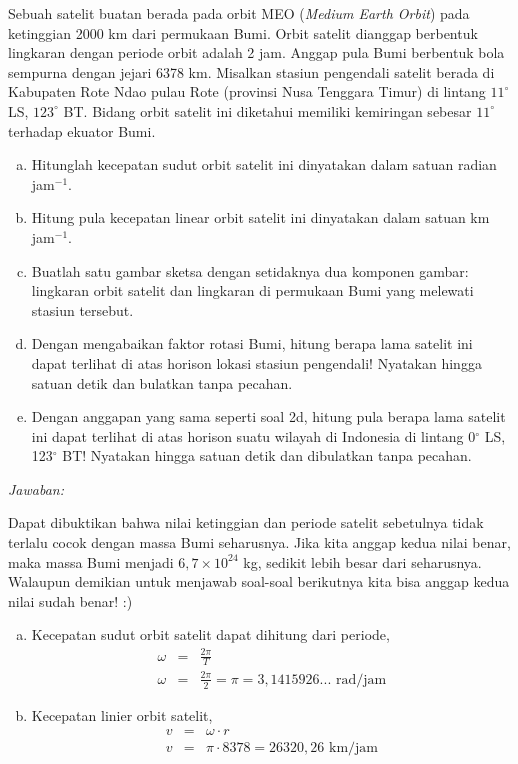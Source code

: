 \documentclass[11pt,fleqn]{exam}
\begin{document}
\begin{questions}
\newpage
\question Sebuah satelit buatan berada pada orbit MEO (\textit{Medium Earth Orbit}) pada ketinggian 2000 km dari permukaan Bumi. Orbit satelit dianggap berbentuk lingkaran dengan periode orbit adalah 2 jam. Anggap pula Bumi berbentuk bola sempurna dengan jejari 6378 km. Misalkan stasiun pengendali satelit berada di Kabupaten Rote Ndao pulau Rote (provinsi Nusa Tenggara Timur) di lintang $11^\circ$ LS, $123^\circ$ BT. Bidang orbit satelit ini diketahui memiliki kemiringan sebesar $11^\circ$ terhadap ekuator Bumi.
\begin{enumerate}[a.]
    \item Hitunglah kecepatan sudut orbit satelit ini dinyatakan dalam satuan radian jam$^{-1}$.
    \item Hitung pula kecepatan linear orbit satelit ini dinyatakan dalam satuan km jam$^{-1}$.
    \item Buatlah satu gambar sketsa dengan setidaknya dua komponen gambar: lingkaran orbit satelit dan lingkaran di permukaan Bumi yang melewati stasiun tersebut.
    \item Dengan mengabaikan faktor rotasi Bumi, hitung berapa lama satelit ini dapat terlihat di atas horison lokasi stasiun pengendali! Nyatakan hingga satuan detik dan bulatkan tanpa pecahan.
    \item Dengan anggapan yang sama seperti soal 2d, hitung pula berapa lama satelit ini dapat terlihat di atas horison suatu wilayah di Indonesia di lintang 0$^\circ$ LS, 123$^\circ$ BT! Nyatakan hingga satuan detik dan dibulatkan tanpa pecahan.
\end{enumerate}


\newpage
\textit{Jawaban:}

Dapat dibuktikan bahwa nilai ketinggian dan periode satelit sebetulnya tidak terlalu cocok dengan massa Bumi seharusnya. Jika kita anggap kedua nilai benar, maka massa Bumi menjadi $6,7 \times 10^{24}$ kg, sedikit lebih besar dari seharusnya. Walaupun demikian untuk menjawab soal-soal berikutnya kita bisa anggap kedua nilai sudah benar! :)
\begin{enumerate}[a.]
    \item Kecepatan sudut orbit satelit dapat dihitung dari periode,
    \begin{eqnarray*}
        \omega &=& \frac{2 \pi}{T}\\
        \omega &=& \frac{2 \pi}{2} = \pi = 3,1415926... \text{ rad/jam}
    \end{eqnarray*}
    
    \item Kecepatan linier orbit satelit,
    \begin{eqnarray*}
        v &=& \omega \cdot r\\
        v &=& \pi \cdot 8378 = 26320,26 \text{ km/jam}
    \end{eqnarray*}


\end{enumerate}
\end{questions}
\end{document}
